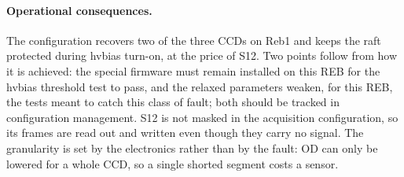 \paragraph{Operational consequences.}
The configuration recovers two of the three CCDs on Reb1 and keeps the raft
protected during hvbias turn-on, at the price of S12. Two points follow from
how it is achieved: the special firmware must remain installed on this REB for
the hvbias threshold test to pass, and the relaxed parameters weaken, for this
REB, the tests meant to catch this class of fault; both should be tracked in
configuration management. S12 is not masked in the acquisition configuration,
so its frames are read out and written even though they carry no signal. The
granularity is set by the electronics rather than by the fault: OD can only be
lowered for a whole CCD, so a single shorted segment costs a sensor.
